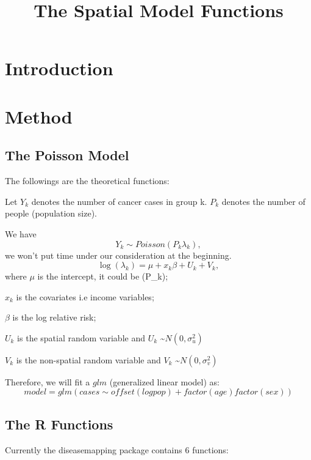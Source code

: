 \documentclass{article}
\title{The Spatial Model Functions}
\begin{document}
\maketitle

\large
\section{Introduction}

\section{Method}
\subsection{The Poisson Model}
The followings are the theoretical functions:

Let $Y_k$ denotes the number of cancer cases in group k.
$P_k$ denotes the number of people (population size).


We have
     \[Y_k \sim Poisson (P_k\lambda_k),\]  we won't put time under our consideration at the beginning.  %
     \[\log(\lambda_k) = \mu +  x_k\beta + U_k + V_k,\]
where      $\mu$ is the intercept, it could be \log(P_k);

           $x_k$ is the covariates i.e income variables;
           
           $\beta$ is the log relative risk;
           
           $U_k$ is the spatial random variable and $U_k$ \sim $N(0, \sigma_u^2)$
           
           $V_k$ is the non-spatial random variable and $V_k$ \sim $N(0, \sigma_v^2)$

Therefore, we will fit a $glm$ (generalized linear model) as:
    \[model = glm( cases \sim offset(logpop) + factor(age) factor(sex) )\]



\subsection{The R Functions}
Currently the diseasemapping package contains $6$ functions:  
\end{document}
